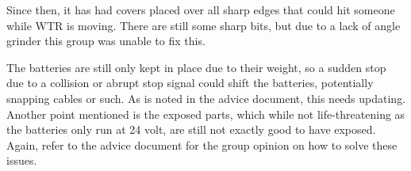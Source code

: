Since then, it has had covers placed over all sharp edges that could hit someone while WTR is moving.
There are still some sharp bits, but due to a lack of angle grinder this group was unable to fix this.

The batteries are still only kept in place due to their weight, so a sudden stop due to a collision or abrupt stop signal could shift the batteries, potentially snapping cables or such.
As is noted in the advice document, this needs updating.
Another point mentioned is the exposed parts, which while not life-threatening as the batteries only run at 24 volt, are still not exactly good to have exposed.
Again, refer to the advice document for the group opinion on how to solve these issues.

\newpage
